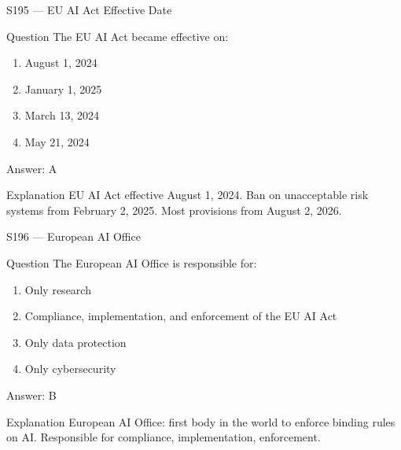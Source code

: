 \documentclass[aspectratio=169,8pt]{beamer}
\begin{document}
	\begin{frame}{S195 --- EU AI Act Effective Date}
		\begin{block}{Question}
			The EU AI Act became effective on:
			\begin{enumerate}
				\item August 1, 2024
				\item January 1, 2025
				\item March 13, 2024
				\item May 21, 2024
			\end{enumerate}
		\end{block}
		\begin{exampleblock}{Answer: A}\end{exampleblock}
		\begin{block}{Explanation}
			EU AI Act effective August 1, 2024. Ban on unacceptable risk systems from February 2, 2025. Most provisions from August 2, 2026.
		\end{block}
	\end{frame}
	
	\begin{frame}{S196 --- European AI Office}
		\begin{block}{Question}
			The European AI Office is responsible for:
			\begin{enumerate}
				\item Only research
				\item Compliance, implementation, and enforcement of the EU AI Act
				\item Only data protection
				\item Only cybersecurity
			\end{enumerate}
		\end{block}
		\begin{exampleblock}{Answer: B}\end{exampleblock}
		\begin{block}{Explanation}
			European AI Office: first body in the world to enforce binding rules on AI. Responsible for compliance, implementation, enforcement.
		\end{block}
	\end{frame}
	
\end{document}
